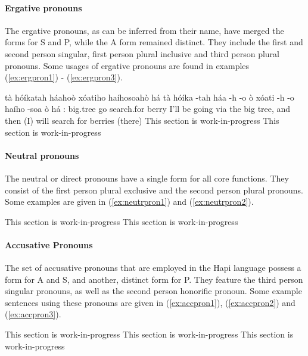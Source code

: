 \documentclass[a4paper, 12pt, oneside]{memoir}
\begin{document}
\paragraph{Ergative pronouns}
The ergative pronouns, as can be inferred from their name, have merged the forms for S and P, while the A form remained distinct. They include the first and second person singular, first person plural inclusive and third person plural pronouns. Some usages of ergative pronouns are found in examples (\ref{ex:ergpron1}) - (\ref{ex:ergpron3}).
\begin{examples}
\newbaarucmd{\cl}{\baarujuncture{\texttt{==}}}
\ex \label{ex:ergpron1}
\words tà hóíkatah háahoò xóatiho haíhosoahò há
\bits tà hóíka -tah háa -h -o \cl ò xóati -h -o haího -soa \cl ò há 
\gloss {\Fs}:{\Subject} big.tree {\Prl} go {\Ff} {\Fut} {\Seq} search.for {\Ff} {\Fut} berry {\Pl} {\Seq} {\Cngr}
\tr I'll be going via the big tree, and then (I) will search for berries (there)
\ex \label{ex:ergpron2}
This section is work-in-progress
\ex \label{ex:ergpron3}
This section is work-in-progress
\end{examples}
\paragraph{Neutral pronouns}
The neutral or direct pronouns have a single form for all core functions. They consist of the first person plural exclusive and the second person plural pronouns. Some examples are given in (\ref{ex:neutrpron1}) and (\ref{ex:neutrpron2}).
\begin{examples}
\ex \label{ex:neutrpron1}
This section is work-in-progress
\ex \label{ex:neutrpron2}
This section is work-in-progress
\end{examples}
\paragraph{Accusative Pronouns}
The set of accusative pronouns that are employed in the Hapi language possess a form for A and S, and another, distinct form for P. They feature the third person singular pronouns, as well as the second person honorific pronoun. Some example sentences using these pronouns are given in (\ref{ex:accpron1}), (\ref{ex:accpron2}) and (\ref{ex:accpron3}).
\begin{examples}
\ex \label{ex:accpron1}
This section is work-in-progress
\ex \label{ex:accpron2}
This section is work-in-progress
\ex \label{ex:accpron3}
This section is work-in-progress
\end{examples}
\end{document}
